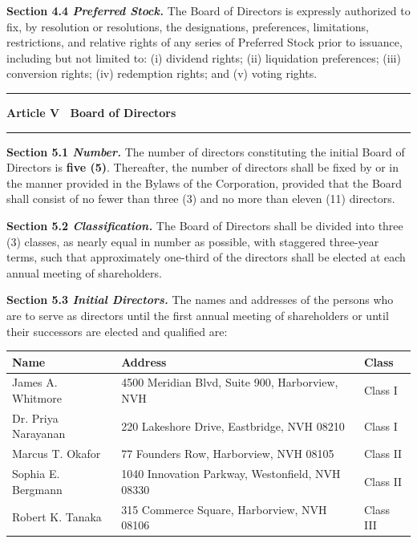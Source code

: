 \documentclass[12pt,a4paper]{scrartcl}
\newcommand{\articletitle}[1]{%
  \par\vspace{4pt}\noindent%
  {\color{GoldAccent}\rule{\linewidth}{1.2pt}}\par\vspace{2pt}\noindent%
  {\large\bfseries\color{NavyDeep}#1}\par\vspace{4pt}\noindent%
  {\color{RuleGray}\rule{\linewidth}{0.4pt}}\par\vspace{6pt}\noindent%
}
\newcommand{\sectionlabel}[1]{%
  \noindent\textbf{\color{NavyDeep}#1}\quad%
}
\begin{document}
\sectionlabel{Section 4.4 \textit{Preferred Stock.}}The Board of Directors is expressly
authorized to fix, by resolution or resolutions, the designations, preferences, limitations,
restrictions, and relative rights of any series of Preferred Stock prior to issuance, including
but not limited to: (i) dividend rights; (ii) liquidation preferences; (iii) conversion rights;
(iv) redemption rights; and (v) voting rights.

\articletitle{Article V \textemdash\ Board of Directors}

\sectionlabel{Section 5.1 \textit{Number.}}The number of directors constituting the initial
Board of Directors is \textbf{five (5)}. Thereafter, the number of directors shall be fixed by
or in the manner provided in the Bylaws of the Corporation, provided that the Board shall
consist of no fewer than three (3) and no more than eleven (11) directors.

\sectionlabel{Section 5.2 \textit{Classification.}}The Board of Directors shall be divided into
three (3) classes, as nearly equal in number as possible, with staggered three-year terms,
such that approximately one-third of the directors shall be elected at each annual meeting of
shareholders.

\sectionlabel{Section 5.3 \textit{Initial Directors.}}The names and addresses of the persons
who are to serve as directors until the first annual meeting of shareholders or until their
successors are elected and qualified are:

\vspace{8pt}
\noindent\begin{tabularx}{\linewidth}{@{} l l l @{}}
\toprule
\rowcolor{NavyDeep}
\color{white}\textbf{Name} &
\color{white}\textbf{Address} &
\color{white}\textbf{Class} \\
\midrule
James A. Whitmore       & 4500 Meridian Blvd, Suite 900, Harborview, NVH & Class I   \\
\rowcolor{GoldLight}
Dr. Priya Narayanan     & 220 Lakeshore Drive, Eastbridge, NVH 08210      & Class I   \\
Marcus T. Okafor        & 77 Founders Row, Harborview, NVH 08105          & Class II  \\
\rowcolor{GoldLight}
Sophia E. Bergmann      & 1040 Innovation Parkway, Westonfield, NVH 08330 & Class II  \\
Robert K. Tanaka        & 315 Commerce Square, Harborview, NVH 08106      & Class III \\
\bottomrule
\end{tabularx}
\vspace{8pt}
\end{document}
